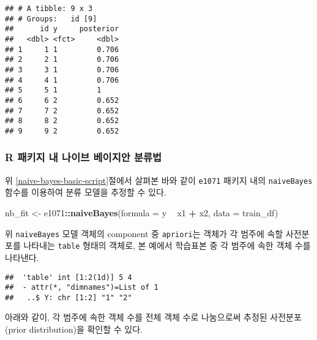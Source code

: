 \documentclass[]{book}
\newenvironment{Shaded}{\begin{snugshade}}{\end{snugshade}}
\newcommand{\DataTypeTok}[1]{\textcolor[rgb]{0.13,0.29,0.53}{#1}}
\newcommand{\KeywordTok}[1]{\textcolor[rgb]{0.13,0.29,0.53}{\textbf{#1}}}
\newcommand{\NormalTok}[1]{#1}
\newcommand{\OperatorTok}[1]{\textcolor[rgb]{0.81,0.36,0.00}{\textbf{#1}}}
\newcommand{\StringTok}[1]{\textcolor[rgb]{0.31,0.60,0.02}{#1}}
\begin{document}
\begin{verbatim}
## # A tibble: 9 x 3
## # Groups:   id [9]
##      id y     posterior
##   <dbl> <fct>     <dbl>
## 1     1 1         0.706
## 2     2 1         0.706
## 3     3 1         0.706
## 4     4 1         0.706
## 5     5 1         1    
## 6     6 2         0.652
## 7     7 2         0.652
## 8     8 2         0.652
## 9     9 2         0.652
\end{verbatim}

\hypertarget{naive-bayes-pkg}{%
\subsubsection{R 패키지 내 나이브 베이지안 분류법}\label{naive-bayes-pkg}}

위 \ref{naive-bayes-basic-script}절에서 살펴본 바와 같이 \texttt{e1071} 패키지 내의 \texttt{naiveBayes} 함수를 이용하여 분류 모델을 추정할 수 있다.

\begin{Shaded}
\begin{Highlighting}[]
\NormalTok{nb_fit <-}\StringTok{ }\NormalTok{e1071}\OperatorTok{::}\KeywordTok{naiveBayes}\NormalTok{(}\DataTypeTok{formula =}\NormalTok{ y }\OperatorTok{~}\StringTok{ }\NormalTok{x1 }\OperatorTok{+}\StringTok{ }\NormalTok{x2, }\DataTypeTok{data =}\NormalTok{ train_df)}
\end{Highlighting}
\end{Shaded}

위 \texttt{naiveBayes} 모델 객체의 component 중 \texttt{apriori}는 객체가 각 범주에 속할 사전분포를 나타내는 \texttt{table} 형태의 객체로, 본 예에서 학습표본 중 각 범주에 속한 객체 수를 나타낸다.

\begin{Shaded}
\end{Shaded}

\begin{verbatim}
##  'table' int [1:2(1d)] 5 4
##  - attr(*, "dimnames")=List of 1
##   ..$ Y: chr [1:2] "1" "2"
\end{verbatim}

아래와 같이, 각 범주에 속한 객체 수를 전체 객체 수로 나눔으로써 추정된 사전분포(prior distribution)을 확인할 수 있다.

\begin{Shaded}
\end{Shaded}
\end{document}
